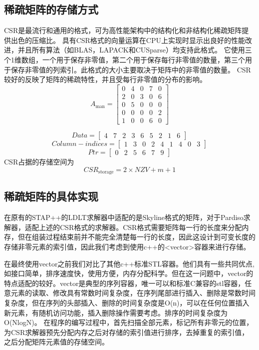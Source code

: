 \documentclass[forprint]{WHUBachelor}
\begin{document}
\subsection{稀疏矩阵的存储方式}
CSR是最流行和通用的格式，可为高性能架构中的结构化和非结构化稀疏矩阵提供出色的压缩比。 具有CSR格式的向量运算在CPU上实现时显示出良好的性能改进，并且所有算法（如BLAS，LAPACK和CUSparse）均支持此格式。 它使用三个1维数组，一个用于保存非零值，第二个用于保存每行非零值的数量，第三个用于保存非零值的列索引。此格式的大小主要取决于矩阵中的非零值的数量。 CSR较好的反映了矩阵的稀疏特性，并且受每行非零值的分布的影响。
\begin {equation} 
A_{\operatorname{man}}=\left[ \begin{array}{ccccc}{0} & {4} & {0} & {7} & {0} \\ {2} & {0} & {3} & {0} & {6} \\ {0} & {5} & {0} & {0} & {0} \\ {0} & {0} & {0} & {0} & {2} \\ {1} & {0} & {0} & {6} & {0}\end{array}\right]
 \end {equation}

\begin{equation} 
Data=\left[ \begin{array}{ccccccccc}{4} & {7} & {2} & {3} & {6} & {5} & {2} & {1} & {6}\end{array}\right]
 \end{equation}
\begin{equation} 
Column-indices=\left[ \begin{array}{lllllllll}{1} & {3} & {0} & {2} & {4} & {1} & {4} & {0} & {3}\end{array}\right]
 \end{equation}
\begin{equation} 
P t r=\left[ \begin{array}{llllll}{0} & {2} & {5} & {6} & {7} & {9}\end{array}\right]
 \end{equation}
CSR占据的存储空间为
\begin{equation} 
CSR_{\text {storage}}=2 \times N Z V+m+1
 \end{equation}
\subsection{稀疏矩阵的具体实现}
在原有的STAP++的LDLT求解器中适配的是Skyline格式的矩阵，对于Pardiso求解器，适配上述的CSR格式的求解器。CSR格式需要矩阵每一行的长度来分配内存，但在组装过程结束前并不能完全清楚每一行的长度，因此这设计到可变长度的存储非零元素的索引值，因此我们考虑到使用c++的<vector>容器来进行存储。\par
在最终使用vector之前我们对比了其他c++标准STL容器。他们具有一些共同优点,如接口简单，排序速度快，使用方便，内存分配科学。但在这一问题中，vector的特点适配的较好。vector是典型的序列容器，唯一可以和标准C兼容的stl容器，任意元素的读取、修改具有常数时间复杂度，在序列尾部进行插入、删除是常数时间复杂度，但在序列的头部插入、删除的时间复杂度是O(n)，可以在任何位置插入新元素，有随机访问功能，插入删除操作需要考虑。排序的时间复杂度为O(NlogN)。
在程序的编写过程中，首先扫描全部元素，标记所有非零元的位置，为CSR求解器预先分配内存之后对存储的索引值进行排序，去掉重复的索引值，之后分配矩阵元素值的存储空间。
\end{document}
